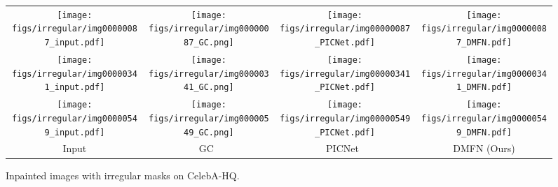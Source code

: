 \documentclass[journal]{IEEEtran}
\begin{document}
\begin{figure}[ht]
	\centering
	\begin{adjustbox}{valign=t}
		\begin{tabular}{cccc}
			
			\texttt{[image: figs/irregular/img00000087\_input.pdf]} &
			\hspace{-4mm}
			\texttt{[image: figs/irregular/img00000087\_GC.png]} &
			\hspace{-4mm}
			\texttt{[image: figs/irregular/img00000087\_PICNet.pdf]} &
			\hspace{-4mm}
			\texttt{[image: figs/irregular/img00000087\_DMFN.pdf]} \\
			
			
			\texttt{[image: figs/irregular/img00000341\_input.pdf]} &
			\hspace{-4mm}
			\texttt{[image: figs/irregular/img00000341\_GC.png]} &
			\hspace{-4mm}
			\texttt{[image: figs/irregular/img00000341\_PICNet.pdf]} &
			\hspace{-4mm}
			\texttt{[image: figs/irregular/img00000341\_DMFN.pdf]} \\
			
			
			\texttt{[image: figs/irregular/img00000549\_input.pdf]} &
			\hspace{-4mm}
			\texttt{[image: figs/irregular/img00000549\_GC.png]} &
			\hspace{-4mm}
			\texttt{[image: figs/irregular/img00000549\_PICNet.pdf]} &
			\hspace{-4mm}
			\texttt{[image: figs/irregular/img00000549\_DMFN.pdf]} \\
			
			Input &\hspace{-4mm} GC~\cite{GC} &\hspace{-4mm} PICNet~\cite{PICNet} &\hspace{-4mm} DMFN (Ours) \\
		\end{tabular}
	\end{adjustbox}
	\caption{Inpainted images with irregular masks on CelebA-HQ.}
	\label{fig:irregular2}
\end{figure}
\end{document}
